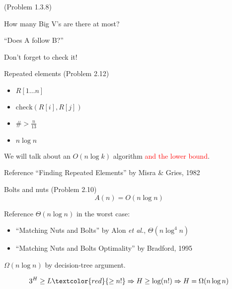 \begin{frame}{(Problem 1.3.8)}
  \centerline{How many Big V's are there at most?}

  \pause
  \vspace{0.50cm}
  \centerline{``Does A follow B?''}

  \pause
  \vspace{0.50cm}
  \centerline{Don't forget to check it!}
\end{frame}
\begin{frame}{Repeated elements (Problem 2.12)}
  \begin{itemize}
	\item $R[1 \dots n]$
	\item $\text{check}(R[i], R[j])$
	\item $\# > \frac{n}{13}$
	\item $n \log n$
  \end{itemize}

  \pause
  \vspace{0.30cm}

  \centerline{We will talk about an $O(n \log k)$ algorithm \textcolor{red}{and the lower bound}.}

  \begin{alertblock}{Reference}
	``Finding Repeated Elements'' by Misra \& Gries, 1982
  \end{alertblock}
\end{frame}
\begin{frame}{Bolts and nuts (Problem 2.10)}
  \[
	A(n) = O(n \log n)
  \]

  \pause
  \vspace{0.30cm}

  \begin{alertblock}{Reference}
	$\Theta(n \log n)$ in the worst case:
	\begin{itemize}
	  \item ``Matching Nuts and Bolts'' by Alon \emph{et al.}, $\Theta(n \log^4 n)$
	  \item ``Matching Nuts and Bolts Optimality'' by Bradford, 1995
	\end{itemize}
  \end{alertblock}

  \pause
  \centerline{$\Omega(n \log n)$ by decision-tree argument.}

  \pause
  \[
	3^{H} \ge L \textcolor{red}{\ge n!} \Rightarrow H \ge \log (n!) \Rightarrow H = \Omega(n \log n)
  \]
\end{frame}
